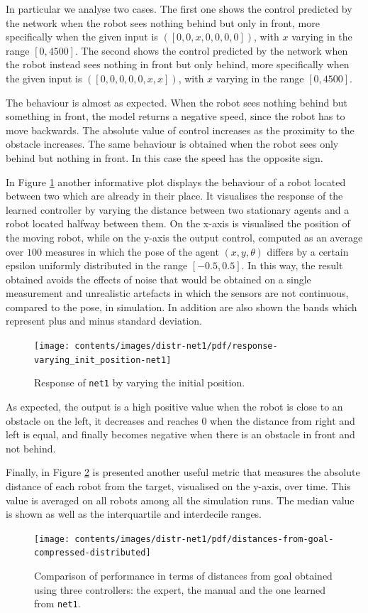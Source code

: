 In particular we analyse two cases. The first one shows the control predicted by 
the network when the robot sees nothing behind but only in front, more 
specifically when the given input is  $([0, 0, x, 0, 0, 0, 0])$, with $x$ varying in the 
range $[0, 4500]$.
The second shows the control predicted by the network when the robot instead 
sees nothing in front but only behind, more specifically when the given input is  
$([0, 0, 0, 0, 0,x , x])$, with $x$ varying in the range $[0, 4500]$.

The behaviour is almost as expected. When the robot sees nothing behind but 
something in front, the model returns a negative speed, since the robot has to 
move backwards. 
The absolute value of control increases as the proximity to the obstacle increases.
The same behaviour is obtained when the robot sees only behind but nothing in 
front. In this case the speed has the opposite sign.

In Figure \ref{fig:net1responseposition} another informative plot displays the 
behaviour of a robot located between two which are already in their place.
It visualises the response of the learned controller by varying the distance 
between two stationary agents and a robot located halfway between them.
On the x-axis is visualised the position of the moving robot, while on the y-axis 
the output control, computed as an average over $100$ measures in which the 
pose of the agent $(x, y, \theta)$ differs by a certain epsilon uniformly distributed 
in the range $[-0.5, 0.5]$. In this way, the result obtained avoids the effects of 
noise that would be obtained on a single measurement and unrealistic artefacts in 
which the sensors are not continuous, compared to the pose, in simulation. In 
addition are also shown the bands which represent plus and minus standard 
deviation.
\begin{figure}[!htb]
	\centering
	\texttt{[image: contents/images/distr-net1/pdf/response-varying\_init\_position-net1]}%
	\caption{Response of \texttt{net1} by varying the initial position.}
	\label{fig:net1responseposition}
\end{figure}

As expected, the output is a high positive value when the robot is close to an 
obstacle on the left, it decreases and reaches $0$ when the distance from right 
and left is equal, and finally becomes negative when there is an obstacle in front 
and not behind.

Finally, in Figure \ref{fig:net1distance} is presented another useful metric that 
measures the absolute distance of each robot from the target, visualised on the 
y-axis, over time. This value is averaged on all robots among all the simulation 
runs. The median value is shown as well as the interquartile and interdecile ranges.
\begin{figure}[!htb]
	\centering
	\texttt{[image: contents/images/distr-net1/pdf/distances-from-goal-compressed-distributed]}%
	\caption[Evaluation of \texttt{net1} distances from goal.]{Comparison of 
	performance in terms of distances from goal obtained using three controllers: 
	the expert, the manual and the one learned from \texttt{net1}.}
	\label{fig:net1distance}
\end{figure}

